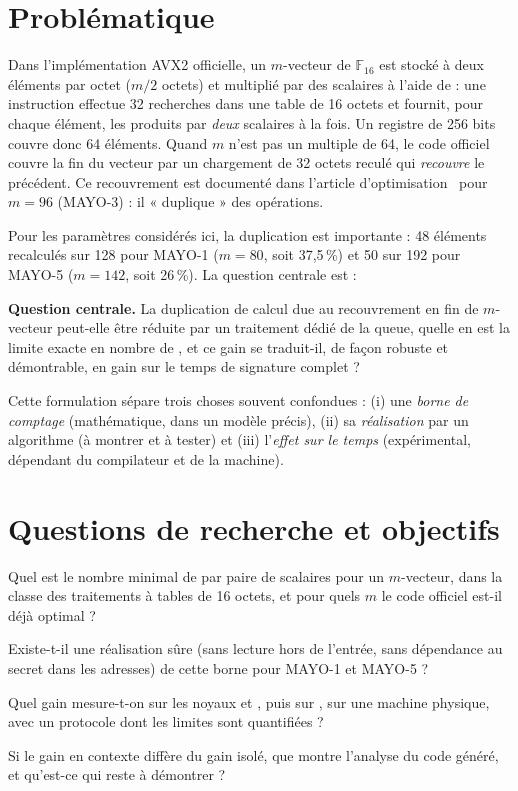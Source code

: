 \section{Problématique}
Dans l'implémentation AVX2 officielle, un $m$-vecteur de $\mathbb{F}_{16}$ est stocké à deux éléments par octet ($m/2$ octets) et multiplié par des scalaires à l'aide de \vpshufb{} : une instruction effectue 32 recherches dans une table de 16 octets et fournit, pour chaque élément, les produits par \emph{deux} scalaires à la fois. Un registre de 256 bits couvre donc 64 éléments. Quand $m$ n'est pas un multiple de 64, le code officiel couvre la fin du vecteur par un chargement de 32 octets reculé qui \emph{recouvre} le précédent. Ce recouvrement est documenté dans l'article d'optimisation~\cite{nibbling} pour $m=96$ (MAYO-3) : il « duplique » des opérations.

Pour les paramètres considérés ici, la duplication est importante : 48 éléments recalculés sur 128 pour MAYO-1 ($m=80$, soit 37,5\,\%) et 50 sur 192 pour MAYO-5 ($m=142$, soit 26\,\%). La question centrale est :

\begin{encadre}
\textbf{Question centrale.} La duplication de calcul due au recouvrement en fin de $m$-vecteur peut-elle être réduite par un traitement dédié de la queue, quelle en est la limite exacte en nombre de \vpshufb{}, et ce gain se traduit-il, de façon robuste et démontrable, en gain sur le temps de signature complet ?
\end{encadre}

Cette formulation sépare trois choses souvent confondues : (i) une \emph{borne de comptage} (mathématique, dans un modèle précis), (ii) sa \emph{réalisation} par un algorithme (à montrer et à tester) et (iii) l'\emph{effet sur le temps} (expérimental, dépendant du compilateur et de la machine).

\section{Questions de recherche et objectifs}
\begin{description}[leftmargin=2.2cm,labelwidth=2cm]
\item[QR1] Quel est le nombre minimal de \vpshufb{} par paire de scalaires pour un $m$-vecteur, dans la classe des traitements à tables de 16 octets, et pour quels $m$ le code officiel est-il déjà optimal ?
\item[QR2] Existe-t-il une réalisation sûre (sans lecture hors de l'entrée, sans dépendance au secret dans les adresses) de cette borne pour MAYO-1 et MAYO-5 ?
\item[QR3] Quel gain mesure-t-on sur les noyaux  et , puis sur , sur une machine physique, avec un protocole dont les limites sont quantifiées ?
\item[QR4] Si le gain en contexte diffère du gain isolé, que montre l'analyse du code généré, et qu'est-ce qui reste à démontrer ?
\end{description}

